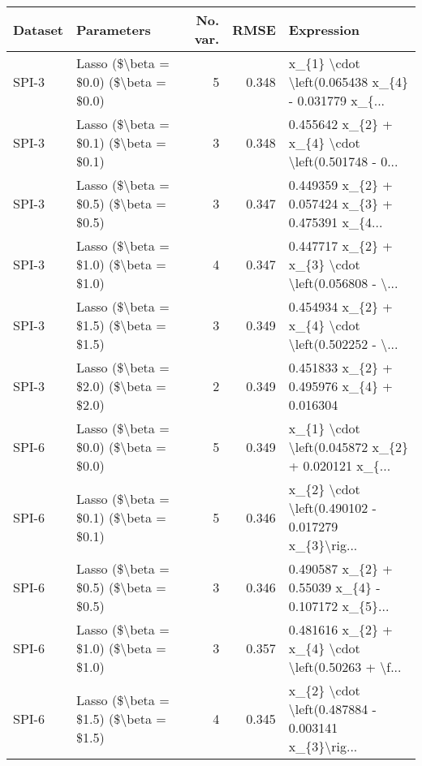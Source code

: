 \begin{tabular}{llrrl}
\toprule
Dataset &                            Parameters &  No. var. &  RMSE &                                         Expression \\
\midrule
  SPI-3 & Lasso (\$\textbackslash beta = \$0.0) (\$\textbackslash beta = \$0.0) &         5 & 0.348 & x\_\{1\} \textbackslash cdot \textbackslash left(0.065438 x\_\{4\} - 0.031779 x\_\{... \\
  SPI-3 & Lasso (\$\textbackslash beta = \$0.1) (\$\textbackslash beta = \$0.1) &         3 & 0.348 & 0.455642 x\_\{2\} + x\_\{4\} \textbackslash cdot \textbackslash left(0.501748 - 0... \\
  SPI-3 & Lasso (\$\textbackslash beta = \$0.5) (\$\textbackslash beta = \$0.5) &         3 & 0.347 & 0.449359 x\_\{2\} + 0.057424 x\_\{3\} + 0.475391 x\_\{4... \\
  SPI-3 & Lasso (\$\textbackslash beta = \$1.0) (\$\textbackslash beta = \$1.0) &         4 & 0.347 & 0.447717 x\_\{2\} + x\_\{3\} \textbackslash cdot \textbackslash left(0.056808 - \textbackslash ... \\
  SPI-3 & Lasso (\$\textbackslash beta = \$1.5) (\$\textbackslash beta = \$1.5) &         3 & 0.349 & 0.454934 x\_\{2\} + x\_\{4\} \textbackslash cdot \textbackslash left(0.502252 - \textbackslash ... \\
  SPI-3 & Lasso (\$\textbackslash beta = \$2.0) (\$\textbackslash beta = \$2.0) &         2 & 0.349 &         0.451833 x\_\{2\} + 0.495976 x\_\{4\} + 0.016304 \\
  SPI-6 & Lasso (\$\textbackslash beta = \$0.0) (\$\textbackslash beta = \$0.0) &         5 & 0.349 & x\_\{1\} \textbackslash cdot \textbackslash left(0.045872 x\_\{2\} + 0.020121 x\_\{... \\
  SPI-6 & Lasso (\$\textbackslash beta = \$0.1) (\$\textbackslash beta = \$0.1) &         5 & 0.346 & x\_\{2\} \textbackslash cdot \textbackslash left(0.490102 - 0.017279 x\_\{3\}\textbackslash rig... \\
  SPI-6 & Lasso (\$\textbackslash beta = \$0.5) (\$\textbackslash beta = \$0.5) &         3 & 0.346 & 0.490587 x\_\{2\} + 0.55039 x\_\{4\} - 0.107172 x\_\{5\}... \\
  SPI-6 & Lasso (\$\textbackslash beta = \$1.0) (\$\textbackslash beta = \$1.0) &         3 & 0.357 & 0.481616 x\_\{2\} + x\_\{4\} \textbackslash cdot \textbackslash left(0.50263 + \textbackslash f... \\
  SPI-6 & Lasso (\$\textbackslash beta = \$1.5) (\$\textbackslash beta = \$1.5) &         4 & 0.345 & x\_\{2\} \textbackslash cdot \textbackslash left(0.487884 - 0.003141 x\_\{3\}\textbackslash rig... \\

\end{tabular}
